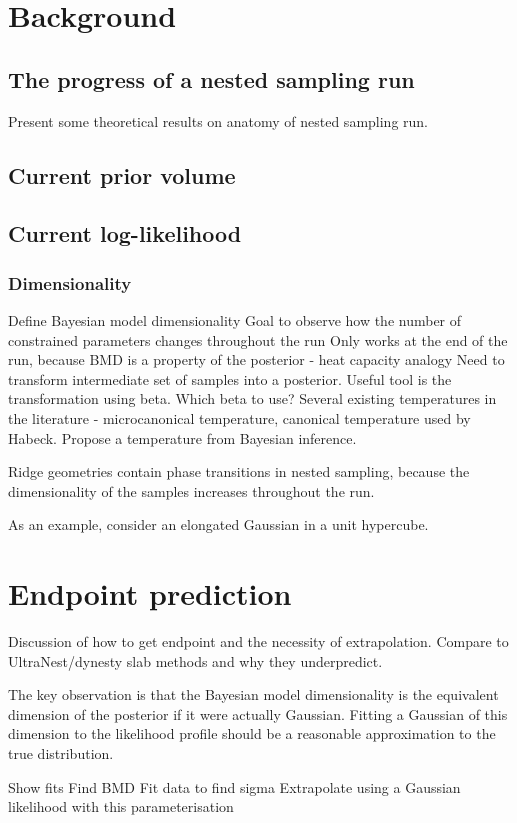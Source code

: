 \documentclass[usenatbib]{mnras}
\begin{document}
\section{Background}


\subsection{The progress of a nested sampling run}
Present some theoretical results on anatomy of nested sampling run.

\subsection{Current prior volume}

\subsection{Current log-likelihood}

\subsubsection{Dimensionality}
Define Bayesian model dimensionality
Goal to observe how the number of constrained parameters changes throughout the run
Only works at the end of the run, because BMD is a property of the posterior - heat capacity analogy
Need to transform intermediate set of samples into a posterior. Useful tool is the transformation using beta. 
Which beta to use? Several existing temperatures in the literature - microcanonical temperature, canonical temperature used by Habeck.
Propose a temperature from Bayesian inference. 


Ridge geometries contain phase transitions in nested sampling, because the dimensionality of the samples increases throughout the run. 
\par
As an example, consider an elongated Gaussian in a unit hypercube. 

\section{Endpoint prediction}
Discussion of how to get endpoint and the necessity of extrapolation. Compare to UltraNest/dynesty slab methods and why they underpredict.
\par
The key observation is that the Bayesian model dimensionality is the equivalent dimension of the posterior if it were actually Gaussian. Fitting a Gaussian of this dimension to the likelihood profile should be a reasonable approximation to the true distribution. 
\par
Show fits
Find BMD
Fit data to find sigma
Extrapolate using a Gaussian likelihood with this parameterisation





\label{lastpage}
\end{document}
